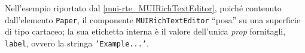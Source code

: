 Nell'esempio riportato dal \autoref{mui-rte_MUIRichTextEditor}, poiché contenuto dall'elemento \texttt{Paper}, il componente \texttt{MUIRichTextEditor} “posa” su una superficie di tipo cartaceo; la sua etichetta interna è il valore dell'unica \textit{prop} fornitagli, \texttt{label}, ovvero la stringa \texttt{'Example...'}. 






